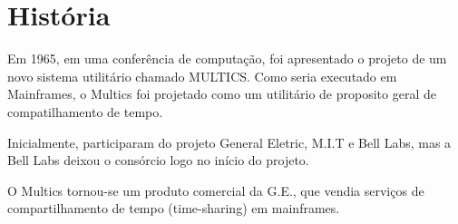 
\chapter{História}
Em 1965, em uma conferência de computação, foi apresentado o projeto de um novo sistema utilitário chamado MULTICS. Como seria executado em Mainframes, o Multics foi projetado como um utilitário de proposito geral de compatilhamento de tempo.

Inicialmente, participaram do projeto General Eletric, M.I.T e Bell Labs, mas
a Bell Labs deixou o consórcio logo no início do projeto. 

O Multics tornou-se um produto comercial da G.E., que vendia serviços de
compartilhamento de tempo (time-sharing) em mainframes.
